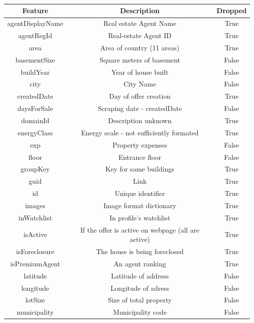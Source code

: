 \documentclass[12pt,a4paper]{article}
\begin{document}
{\subsubsection{}  
\begin{tabular}{|c|c|c|}
\hline 
\textbf{Feature} & \textbf{Description} & \textbf{Dropped} \\ 
\hline 
agentDisplayName & Real estate Agent Name & True \\ 
\hline 
agentRegId & Real-estate Agent ID & True \\ 
\hline 
area & Area of country (11 areas) & True \\ 
\hline 
basementSize & Square meters of basement & False \\ 
\hline 
buildYear & Year of house built & False \\ 
\hline 
city & City Name & False \\ 
\hline 
createdDate & Day of offer creation & True \\ 
\hline 
daysForSale & Scraping date - createdDate & False \\ 
\hline 
domainId & Description unknown & True \\ 
\hline 
energyClass & Energy scale - not sufficiently formated & True \\ 
\hline 
exp & Property expenses & False \\ 
\hline 
floor & Entrance floor & False \\ 
\hline 
groupKey & Key for same buildings & True \\ 
\hline 
guid & Link & True \\ 
\hline 
id & Unique identifier & True \\ 
\hline 
images & Image format dictionary & True \\ 
\hline 
inWatchlist & In profile's watchlist & True \\ 
\hline 
isActive & If the offer is active on webpage (all are active)
 & True \\ 
\hline 
isForeclosure & The house is being foreclosed & True \\ 
\hline 
isPremiumAgent & An agent ranking & True \\ 
\hline 
latitude & Latitude of address & False \\ 
\hline 
longitude & Longitude of adress & False \\ 
\hline 
lotSize & Size of total property & False \\ 
\hline 
municipality & Municipality code & False \\ 

\end{tabular}}
\end{document}
